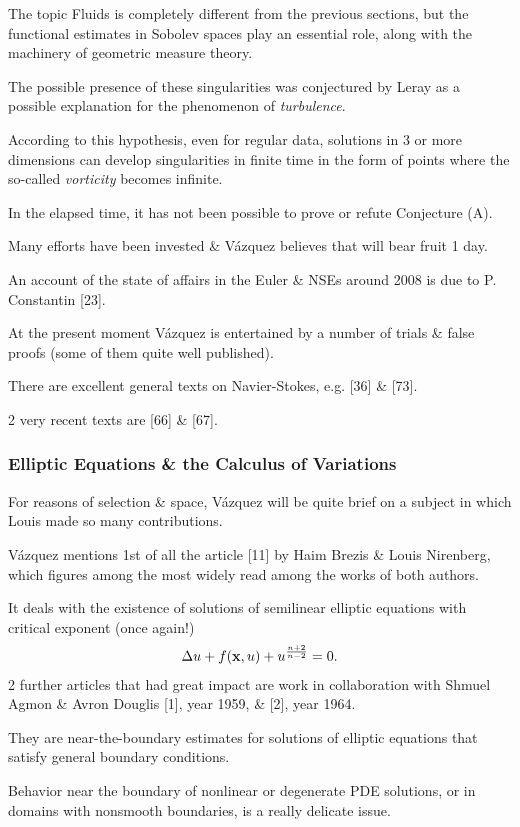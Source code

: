 \documentclass{article}
\begin{document}
The topic Fluids is completely different from the previous sections, but the functional estimates in Sobolev spaces play an essential role, along with the machinery of geometric measure theory.

%
The possible presence of these singularities was conjectured by Leray as a possible explanation for the phenomenon of \textit{turbulence}.

According to this hypothesis, even for regular data, solutions in 3 or more dimensions can develop singularities in finite time in the form of points where the so-called \textit{vorticity} becomes infinite.

%
In the elapsed time, it has not been possible to prove or refute Conjecture (A).

Many efforts have been invested \& V\'azquez believes that will bear fruit 1 day.

An account of the state of affairs in the Euler \& NSEs around 2008 is due to P. Constantin [23].

At the present moment V\'azquez is entertained by a number of trials \& false proofs (some of them quite well published).

There are excellent general texts on Navier-Stokes, e.g. [36] \& [73].

2 very recent texts are [66] \& [67].

\subsubsection{Elliptic Equations \& the Calculus of Variations}
For reasons of selection \& space, V\'azquez will be quite brief on a subject in which Louis made so many contributions.

V\'azquez mentions 1st of all the article [11] by Haim Brezis \& Louis Nirenberg, which figures among the most widely read among the works of both authors.

It deals with the existence of solutions of semilinear elliptic equations with critical exponent (once again!)
\begin{align*}
	\Delta u + f({\bf x},u) + u^{\frac{n + 2}{n - 2}} = 0.
\end{align*}
2 further articles that had great impact are work in collaboration with Shmuel Agmon \& Avron Douglis [1], year 1959, \& [2], year 1964.

They are near-the-boundary estimates for solutions of elliptic equations that satisfy general boundary conditions.

Behavior near the boundary of nonlinear or degenerate PDE solutions, or in domains with nonsmooth boundaries, is a really delicate issue.
\end{document}
